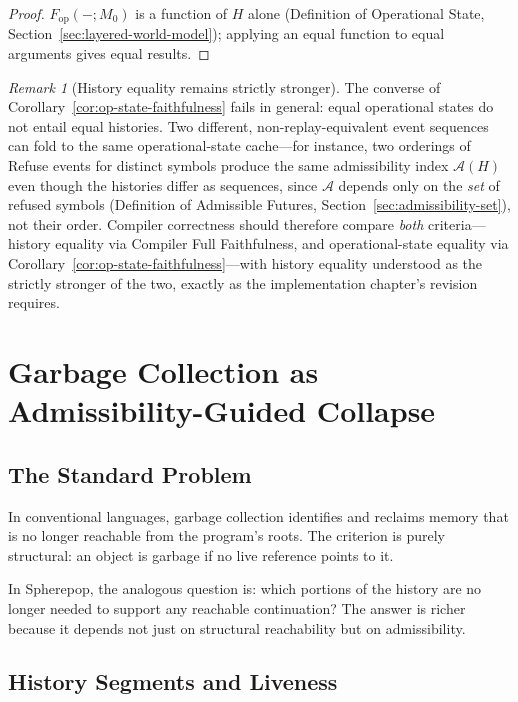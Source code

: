 \documentclass[12pt, a4paper, openany]{book}
\theoremstyle{plain}
\theoremstyle{definition}
\theoremstyle{remark}
\newtheorem{remark}[theorem]{Remark}
\newcommand{\calA}{\mathcal{A}}
\begin{document}
\begin{proof}
$F_{\mathrm{op}}(-; M_0)$ is a function of $H$ alone (Definition of Operational
State, Section~\ref{sec:layered-world-model}); applying an equal function to
equal arguments gives equal results.
\end{proof}

\begin{remark}[History equality remains strictly stronger]
The converse of Corollary~\ref{cor:op-state-faithfulness} fails in general:
equal operational states do not entail equal histories. Two different,
non-replay-equivalent event sequences can fold to the same operational-state
cache---for instance, two orderings of Refuse events for distinct symbols
produce the same admissibility index $\calA(H)$ even though the histories
differ as sequences, since $\calA$ depends only on the \emph{set} of refused
symbols (Definition of Admissible Futures, Section~\ref{sec:admissibility-set}),
not their order. Compiler correctness should therefore compare \emph{both}
criteria---history equality via Compiler Full Faithfulness, and operational-state
equality via Corollary~\ref{cor:op-state-faithfulness}---with history equality
understood as the strictly stronger of the two, exactly as the implementation
chapter's revision requires.
\end{remark}

\chapter{Garbage Collection as Admissibility-Guided Collapse}

\section{The Standard Problem}

In conventional languages, garbage collection identifies and reclaims memory that
is no longer reachable from the program's roots. The criterion is purely
structural: an object is garbage if no live reference points to it.

In Spherepop, the analogous question is: which portions of the history are no
longer needed to support any reachable continuation? The answer is richer because
it depends not just on structural reachability but on admissibility.

\section{History Segments and Liveness}
\end{document}
